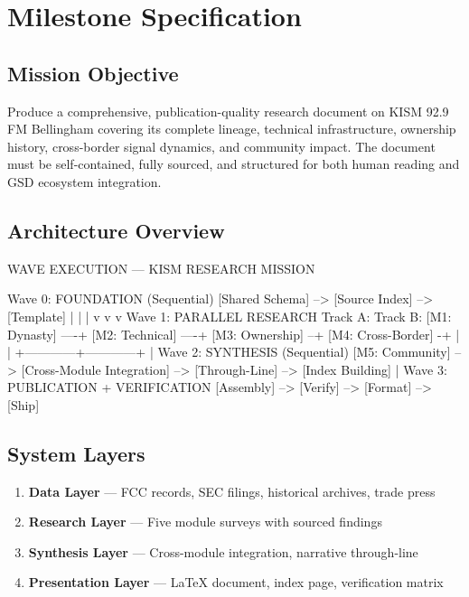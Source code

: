 \documentclass[11pt,letterpaper]{article}
\newcommand{\stageheader}[2]{%
  \noindent\colorbox{#2}{\makebox[\textwidth][l]{%
    \textcolor{white}{\bfseries\sffamily\hspace{6pt}#1\hspace{6pt}}}}%
  \vspace{0.5em}\par%
}
\begin{document}
\newpage
\stageheader{STAGE 3 --- MISSION PACKAGE}{tertiary}

\section{Milestone Specification}

\subsection{Mission Objective}

Produce a comprehensive, publication-quality research document on KISM 92.9 FM Bellingham covering its complete lineage, technical infrastructure, ownership history, cross-border signal dynamics, and community impact. The document must be self-contained, fully sourced, and structured for both human reading and GSD ecosystem integration.

\subsection{Architecture Overview}

\begin{asciibox}
WAVE EXECUTION --- KISM RESEARCH MISSION

Wave 0: FOUNDATION (Sequential)
  [Shared Schema] --> [Source Index] --> [Template]
         |                  |               |
         v                  v               v
Wave 1: PARALLEL RESEARCH
  Track A:                 Track B:
  [M1: Dynasty] ----+     [M2: Technical] ----+
  [M3: Ownership] --+     [M4: Cross-Border] -+
         |                         |
         +------------+------------+
                      |
Wave 2: SYNTHESIS (Sequential)
  [M5: Community] --> [Cross-Module Integration]
  --> [Through-Line] --> [Index Building]
                      |
Wave 3: PUBLICATION + VERIFICATION
  [Assembly] --> [Verify] --> [Format] --> [Ship]
\end{asciibox}

\subsection{System Layers}

\begin{enumerate}[nosep]
\item \textbf{Data Layer} --- FCC records, SEC filings, historical archives, trade press
\item \textbf{Research Layer} --- Five module surveys with sourced findings
\item \textbf{Synthesis Layer} --- Cross-module integration, narrative through-line
\item \textbf{Presentation Layer} --- LaTeX document, index page, verification matrix
\end{enumerate}
\end{document}
